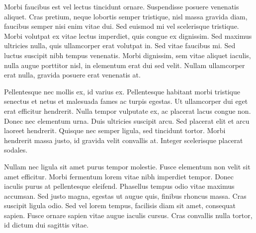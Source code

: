 \documentclass{report}
\begin{document}
Morbi faucibus est vel lectus tincidunt ornare. Suspendisse posuere venenatis aliquet. Cras pretium, neque lobortis semper tristique, nisl massa gravida diam, faucibus semper nisi enim vitae dui. Sed euismod mi vel scelerisque tristique. Morbi volutpat ex vitae lectus imperdiet, quis congue ex dignissim. Sed maximus ultricies nulla, quis ullamcorper erat volutpat in. Sed vitae faucibus mi. Sed luctus suscipit nibh tempus venenatis. Morbi dignissim, sem vitae aliquet iaculis, nulla augue porttitor nisl, in elementum erat dui sed velit. Nullam ullamcorper erat nulla, gravida posuere erat venenatis at.

Pellentesque nec mollis ex, id varius ex. Pellentesque habitant morbi tristique senectus et netus et malesuada fames ac turpis egestas. Ut ullamcorper dui eget erat efficitur hendrerit. Nulla tempor vulputate ex, ac placerat lacus congue non. Donec nec elementum urna. Duis ultricies suscipit arcu. Sed placerat elit et arcu laoreet hendrerit. Quisque nec semper ligula, sed tincidunt tortor. Morbi hendrerit massa justo, id gravida velit convallis at. Integer scelerisque placerat sodales.

Nullam nec ligula sit amet purus tempor molestie. Fusce elementum non velit sit amet efficitur. Morbi fermentum lorem vitae nibh imperdiet tempor. Donec iaculis purus at pellentesque eleifend. Phasellus tempus odio vitae maximus accumsan. Sed justo magna, egestas ut augue quis, finibus rhoncus massa. Cras suscipit ligula odio. Sed vel lorem tempus, facilisis diam sit amet, consequat sapien. Fusce ornare sapien vitae augue iaculis cursus. Cras convallis nulla tortor, id dictum dui sagittis vitae.
\end{document}
